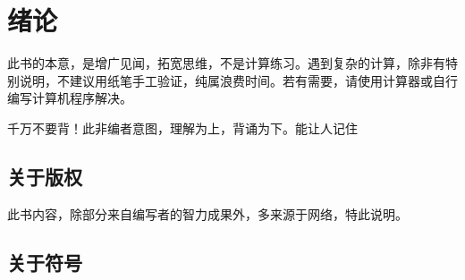 
\chapter{绪论}
\label{chap:introduction}

此书的本意，是增广见闻，拓宽思维，不是计算练习。遇到复杂的计算，除非有特别说明，不建议用纸笔手工验证，纯属浪费时间。若有需要，请使用计算器或自行编写计算机程序解决。

千万不要背！此非编者意图，理解为上，背诵为下。能让人记住

\section{关于版权}
\label{sec:copyright}

此书内容，除部分来自编写者的智力成果外，多来源于网络，特此说明。

\section{关于符号}
\label{sec:symbol}


